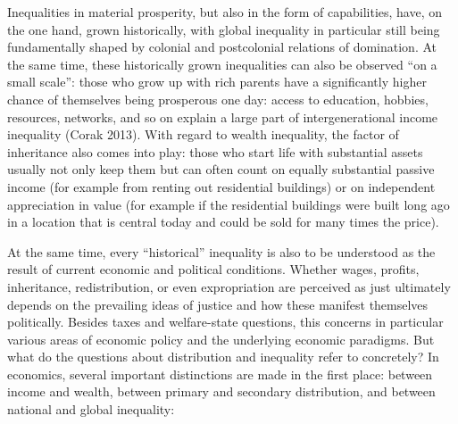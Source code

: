 \documentclass[
  british,
  a4paper,
  DIV=11,
  numbers=noendperiod,
  oneside,
  openany]{scrreprt}
\begin{document}
Inequalities in material prosperity, but also in the form of
capabilities, have, on the one hand, grown historically, with global
inequality in particular still being fundamentally shaped by colonial
and postcolonial relations of domination. At the same time, these
historically grown inequalities can also be observed ``on a small
scale'': those who grow up with rich parents have a significantly higher
chance of themselves being prosperous one day: access to education,
hobbies, resources, networks, and so on explain a large part of
intergenerational income inequality (Corak 2013). With regard to wealth
inequality, the factor of inheritance also comes into play: those who
start life with substantial assets usually not only keep them but can
often count on equally substantial passive income (for example from
renting out residential buildings) or on independent appreciation in
value (for example if the residential buildings were built long ago in a
location that is central today and could be sold for many times the
price).

At the same time, every ``historical'' inequality is also to be
understood as the result of current economic and political conditions.
Whether wages, profits, inheritance, redistribution, or even
expropriation are perceived as just ultimately depends on the prevailing
ideas of justice and how these manifest themselves politically. Besides
taxes and welfare-state questions, this concerns in particular various
areas of economic policy and the underlying economic paradigms. But what
do the questions about distribution and inequality refer to concretely?
In economics, several important distinctions are made in the first
place: between income and wealth, between primary and secondary
distribution, and between national and global inequality:
\end{document}
